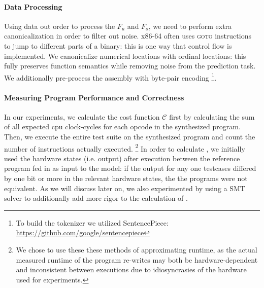 \documentclass{article}
\begin{document}
\paragraph{Data Processing} Using data out  order to process the $F_u$ and $F_o$, we need to perform extra canonicalization in order to filter out noise. x86-64 often uses \textsc{goto} instructions to jump to different parts of a binary: this is one way that control flow is implemented. We canonicalize numerical locations with ordinal locations: this fully preserves function semantics while removing noise from the prediction task. We additionally pre-process the assembly with byte-pair encoding \citep{sennrich2015neural} \footnote{To build the tokenizer we utilized SentencePiece: \url{https://github.com/google/sentencepiece}}.  


\paragraph{Measuring Program Performance and Correctness} In our experiments, we calculate the cost function $\mathcal{C}$ first by calculating the sum of all expected cpu clock-cycles for each opcode in the synthesized program. Then, we execute the entire test suite on the synthesized program and count the number of instructions actually executed.%
\footnote{We chose to use these these methods of approximating runtime, as the actual measured runtime of the program re-writes may both be hardware-dependent and inconsistent between executions due to idiosyncrasies of the hardware used for experiments.}
In order to calculate , we initially used the hardware states (i.e. output) after execution between the reference program fed in as input to the model: if the output for any one testcases differed by one bit or more in the relevant hardware states, the the programs were not equivalent. As we will discuss later on, we also experimented by using a SMT solver to additionally add more rigor to the calculation of .  

\end{document}

